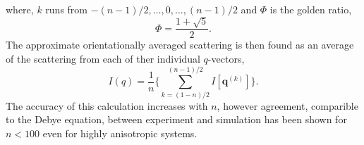 %
where, $k$ runs from $-(n-1)/2,\ldots,0,\ldots,(n-1)/2$ and $\Phi$ is the golden ratio,
%
\begin{equation}
    \Phi = \frac{1+\sqrt{5}}{2}.
\end{equation}
%
The approximate orientationally averaged scattering is then found as an average of the scattering from each of ther individual $q$-vectors,
%
\begin{equation}
    I(q) = \frac{1}{n}\Bigg\{\sum_{k=(1-n)/2}^{(n-1)/2} I[\mathbf{q}^{(k)}]\Bigg\}.
\end{equation}
%
The accuracy of this calculation increases with $n$, however agreement, comparible to the Debye equation, between experiment and simulation has been shown for $n < 100$ even for highly anisotropic systems.\autocite{watson_rapid_2013}
